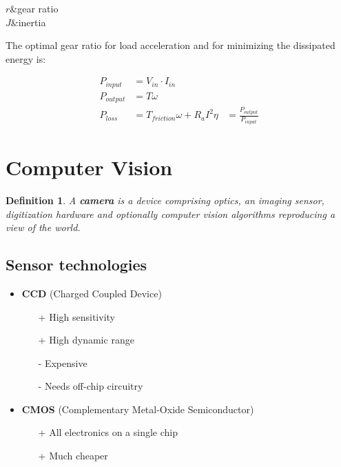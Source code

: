 \documentclass[10pt,a4paper]{scrartcl}
\newtheorem{define}{Definition}
\begin{document}
\begin{multicols*}{2}

\begin{TDefinitionTable*}
$r$&gear ratio\\
$J$&inertia\\
\end{TDefinitionTable*}

The optimal gear ratio for load acceleration and for minimizing the dissipated energy is:


\begin{align*}
P_{input} &= V_{in}\cdot I_{in}\\
P_{output} &= T\omega\\
P_{loss} &= T_{friction}\omega + R_{a}I^2
\eta&=\frac{P_{output}}{P_{input}}
\end{align*}

\section{Computer Vision}

\begin{define}
A \textbf{camera} is a device comprising optics, an imaging sensor, digitization hardware and optionally computer vision algorithms reproducing a view of the world.
\end{define}

\subsection{Sensor technologies}

\begin{itemize}
\item \textbf{CCD} (Charged Coupled Device) 
\begin{itemize}
\item[+] High sensitivity
\item[+] High dynamic range
\item[-] Expensive
\item[-] Needs off-chip circuitry
\end{itemize}
\item \textbf{CMOS} (Complementary Metal-Oxide Semiconductor)
\begin{itemize}
\item[+] All electronics on a single chip
\item[+] Much cheaper
\end{itemize}
\end{itemize}


\end{multicols*}
\end{document}
